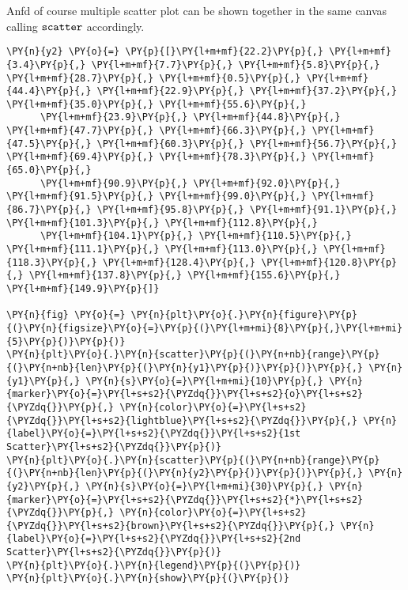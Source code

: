 Anfd of course multiple scatter plot can be shown together in the same
canvas calling \(\tt{scatter}\) accordingly.

    \begin{tcolorbox}[breakable, size=fbox, boxrule=1pt, pad at break*=1mm,colback=cellbackground, colframe=cellborder]
\begin{Verbatim}[commandchars=\\\{\}]
\PY{n}{y2} \PY{o}{=} \PY{p}{[}\PY{l+m+mf}{22.2}\PY{p}{,} \PY{l+m+mf}{3.4}\PY{p}{,} \PY{l+m+mf}{7.7}\PY{p}{,} \PY{l+m+mf}{5.8}\PY{p}{,} \PY{l+m+mf}{28.7}\PY{p}{,} \PY{l+m+mf}{0.5}\PY{p}{,} \PY{l+m+mf}{44.4}\PY{p}{,} \PY{l+m+mf}{22.9}\PY{p}{,} \PY{l+m+mf}{37.2}\PY{p}{,} \PY{l+m+mf}{35.0}\PY{p}{,} \PY{l+m+mf}{55.6}\PY{p}{,} 
      \PY{l+m+mf}{23.9}\PY{p}{,} \PY{l+m+mf}{44.8}\PY{p}{,} \PY{l+m+mf}{47.7}\PY{p}{,} \PY{l+m+mf}{66.3}\PY{p}{,} \PY{l+m+mf}{47.5}\PY{p}{,} \PY{l+m+mf}{60.3}\PY{p}{,} \PY{l+m+mf}{56.7}\PY{p}{,} \PY{l+m+mf}{69.4}\PY{p}{,} \PY{l+m+mf}{78.3}\PY{p}{,} \PY{l+m+mf}{65.0}\PY{p}{,} 
      \PY{l+m+mf}{90.9}\PY{p}{,} \PY{l+m+mf}{92.0}\PY{p}{,} \PY{l+m+mf}{91.5}\PY{p}{,} \PY{l+m+mf}{99.0}\PY{p}{,} \PY{l+m+mf}{86.7}\PY{p}{,} \PY{l+m+mf}{95.8}\PY{p}{,} \PY{l+m+mf}{91.1}\PY{p}{,} \PY{l+m+mf}{101.3}\PY{p}{,} \PY{l+m+mf}{112.8}\PY{p}{,} 
      \PY{l+m+mf}{104.1}\PY{p}{,} \PY{l+m+mf}{110.5}\PY{p}{,} \PY{l+m+mf}{111.1}\PY{p}{,} \PY{l+m+mf}{113.0}\PY{p}{,} \PY{l+m+mf}{118.3}\PY{p}{,} \PY{l+m+mf}{128.4}\PY{p}{,} \PY{l+m+mf}{120.8}\PY{p}{,} \PY{l+m+mf}{137.8}\PY{p}{,} \PY{l+m+mf}{155.6}\PY{p}{,} \PY{l+m+mf}{149.9}\PY{p}{]}

\PY{n}{fig} \PY{o}{=} \PY{n}{plt}\PY{o}{.}\PY{n}{figure}\PY{p}{(}\PY{n}{figsize}\PY{o}{=}\PY{p}{(}\PY{l+m+mi}{8}\PY{p}{,}\PY{l+m+mi}{5}\PY{p}{)}\PY{p}{)}
\PY{n}{plt}\PY{o}{.}\PY{n}{scatter}\PY{p}{(}\PY{n+nb}{range}\PY{p}{(}\PY{n+nb}{len}\PY{p}{(}\PY{n}{y1}\PY{p}{)}\PY{p}{)}\PY{p}{,} \PY{n}{y1}\PY{p}{,} \PY{n}{s}\PY{o}{=}\PY{l+m+mi}{10}\PY{p}{,} \PY{n}{marker}\PY{o}{=}\PY{l+s+s2}{\PYZdq{}}\PY{l+s+s2}{o}\PY{l+s+s2}{\PYZdq{}}\PY{p}{,} \PY{n}{color}\PY{o}{=}\PY{l+s+s2}{\PYZdq{}}\PY{l+s+s2}{lightblue}\PY{l+s+s2}{\PYZdq{}}\PY{p}{,} \PY{n}{label}\PY{o}{=}\PY{l+s+s2}{\PYZdq{}}\PY{l+s+s2}{1st Scatter}\PY{l+s+s2}{\PYZdq{}}\PY{p}{)}
\PY{n}{plt}\PY{o}{.}\PY{n}{scatter}\PY{p}{(}\PY{n+nb}{range}\PY{p}{(}\PY{n+nb}{len}\PY{p}{(}\PY{n}{y2}\PY{p}{)}\PY{p}{)}\PY{p}{,} \PY{n}{y2}\PY{p}{,} \PY{n}{s}\PY{o}{=}\PY{l+m+mi}{30}\PY{p}{,} \PY{n}{marker}\PY{o}{=}\PY{l+s+s2}{\PYZdq{}}\PY{l+s+s2}{*}\PY{l+s+s2}{\PYZdq{}}\PY{p}{,} \PY{n}{color}\PY{o}{=}\PY{l+s+s2}{\PYZdq{}}\PY{l+s+s2}{brown}\PY{l+s+s2}{\PYZdq{}}\PY{p}{,} \PY{n}{label}\PY{o}{=}\PY{l+s+s2}{\PYZdq{}}\PY{l+s+s2}{2nd Scatter}\PY{l+s+s2}{\PYZdq{}}\PY{p}{)}
\PY{n}{plt}\PY{o}{.}\PY{n}{legend}\PY{p}{(}\PY{p}{)}
\PY{n}{plt}\PY{o}{.}\PY{n}{show}\PY{p}{(}\PY{p}{)}
\end{Verbatim}
\end{tcolorbox}

